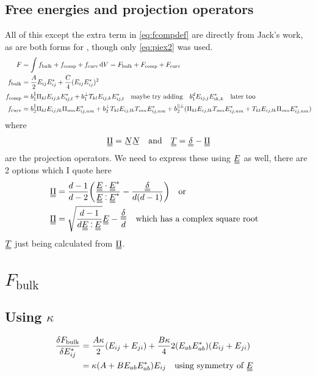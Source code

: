 \documentclass[11pt]{article}
\begin{document}
\subsection{Free energies and projection operators}\label{sec:freeenergies}
All of this except the extra term in \cref{eq:fcompdef} are directly from Jack's work, as are both forms for \PP, though only \cref{eq:piex2} was used.
\begin{align}
    F &= \int f_\text{bulk} + f_\text{comp} + f_\text{curv} \dd{V} = F_\text{bulk} + F_\text{comp} + F_\text{curv}\\
    f_\text{bulk} &= \frac{A}{2} E_{ij}E_{ij}^* + \frac{C}{4} (E_{ij}E_{ij}^*)^2 \\
    f_\text{comp} &= b_1^\parallel \Pi_{kl} E_{ij,k}E_{ij,l}^* + b_1^\perp T_{kl} E_{ij,k}E_{ij,l}^* \qq{maybe try adding} b_1^d E_{ij,j}E_{ik,k}^* \qq{later too} \label{eq:fcompdef} \\
    f_\text{curv} &= b_2^\parallel \Pi_{kl}E_{ij,lk}\Pi_{mn}E_{ij,nm}^* + b_2^\perp T_{kl}E_{ij,lk}T_{mn}E_{ij,nm}^* + b_2^{\parallel\perp}(\Pi_{kl}E_{ij,lk}T_{mn}E_{ij,nm}^* + T_{kl}E_{ij,lk}\Pi_{mn}E_{ij,nm}^*)
\end{align}
where
\begin{align}
    \du{\Pi} = \su{N} \su{N} && \text{and} && \du{T} = \du{\delta} - \du{\Pi}
\end{align}
are the projection operators. We need to express these using $\du{E}$ as well, there are 2 options which I quote here
\begin{align}
    \du{\Pi} & = \frac{d-1}{d-2}\qty(\frac{\du{E} \cdot \du{E}^*}{\du{E} \cddot \du{E}^*} - \frac{\du{\delta}}{d(d-1)}) \qq{or} \label{eq:piex1}\\
    \du{\Pi} & = \sqrt{\frac{d-1}{d \du{E} \cddot \du{E}}} \du{E} - \frac{\du{\delta}}{d} \label{eq:piex2} \qq{which has a complex square root}
\end{align}
$\du{T}$ just being calculated from $\du{\Pi}$.

\pagebreak
\section{$F_\text{bulk}$}
\subsection{Using $\kappa$}
\begin{align}
    \fdv{F_\text{bulk}}{E_{ij}^*} &= \frac{A\kappa}{2}(E_{ij} + E_{ji}) + \frac{B\kappa}{4} 2(E_{ab}E_{ab}^*)(E_{ij}+E_{ji}) \\
    &= \kappa(A + B E_{ab}E_{ab}^*) E_{ij} \qq{using symmetry of \EE}
\end{align}
\end{document}
